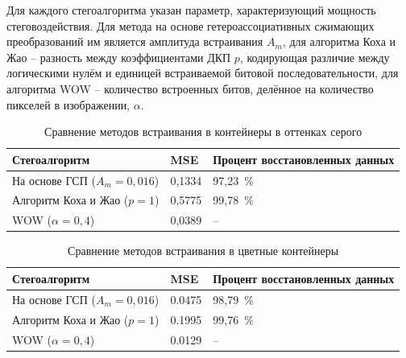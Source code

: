 Для каждого стегоалгоритма указан параметр, характеризующий мощность стеговоздействия. Для метода на основе гетероассоциативных сжимающих преобразований им является амплитуда встраивания $ A_m $, для алгоритма Коха и Жао – разность между коэффициентами ДКП $ p $, кодирующая различие между логическими нулём и единицей встраиваемой битовой последовательности, для алгоритма WOW – количество встроенных битов, делённое на количество пикселей в изображении, $ \alpha $.

\begin{table}[h!]
\centering
\caption{Сравнение методов встраивания в контейнеры в оттенках серого}
    \begin{tabular}{| l | l | l |}
    \hline
    Стегоалгоритм & MSE & Процент восстановленных данных \\ \hline
    На основе ГСП ($ A_m = 0,016 $) & 0,1334 & 97,23~\% \\ \hline
    Алгоритм Коха и Жао ($ p = 1 $) & 0,5775 & 99,78~\% \\ \hline
    WOW ($ \alpha = 0,4 $) & 0,0389 & – \\ \hline
    \end{tabular}
\label{table:1}
\end{table}

\begin{table}[h!]
\centering
    \begin{tabular}{| l | l | l |}
    \hline
    Стегоалгоритм & MSE & Процент восстановленных данных \\ \hline
    На основе ГСП ($ A_m = 0,016 $) & 0.0475 & 98,79~\% \\ \hline
    Алгоритм Коха и Жао ($ p = 1 $) & 0.1995 & 99,76~\% \\ \hline
    WOW ($ \alpha = 0,4 $) & 0.0129 & – \\ \hline
    \end{tabular}
\caption{Сравнение методов встраивания в цветные контейнеры}
\label{table:1Color}
\end{table}

